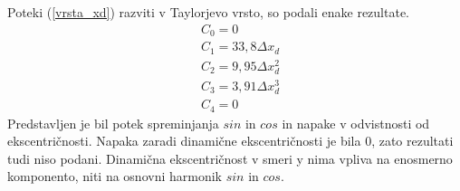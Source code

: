 Poteki (\ref{vrsta_xd}) razviti v Taylorjevo vrsto, so podali enake rezultate.
\begin{eqnarray}
&C_0 =0\\
&C_1 =33,8\Delta x_d\\     
&C_2 =9,95\Delta x_d^{2}\\             
&C_3 =3,91\Delta x_d^{3}\\         
&C_4 =0            
\end{eqnarray}
Predstavljen je bil potek spreminjanja $sin$ in $cos$ in napake v odvistnosti od ekscentričnosti. Napaka zaradi dinamične ekscentričnosti je bila 0, zato rezultati tudi niso podani. Dinamična ekscentričnost v smeri y nima vpliva na enosmerno komponento, niti na osnovni harmonik $sin$ in $cos$.




%
%
%
%
